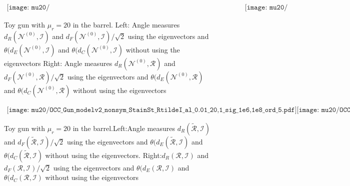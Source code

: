 \documentclass[a4paper,12]{article}
\theoremstyle{definition}
\begin{document}
\begin{figure}[h]
\begin{center}
$\begin{array}{cc}
\texttt{[image: mu20/OCC\_Gun\_modelv2\_nonsym\_StainSt\_N0I\_al\_0.01\_20,1\_sig\_1e6,1e8\_ord\_5.pdf]} &
\texttt{[image: mu20/OCC\_Gun\_modelv2\_nonsym\_StainSt\_N0R\_al\_0.01\_20,1\_sig\_1e6,1e8\_ord\_5.pdf]} 
\end{array}$
\end{center}
\caption{Toy gun with $\mu_r=20$ in the barrel.  Left: Angle measures $d_R({\mathcal N}^{(0)}, {\mathcal I})$ and $d_F({\mathcal N}^{(0)}, {\mathcal I})/\sqrt{2}$ using the eigenvectors and $\theta(d_E({\mathcal N}^{(0)}, {\mathcal I}) $ and $\theta(d_C({\mathcal N}^{(0)}, {\mathcal I} ) $ without using the eigenvectors Right: Angle measures $d_R({\mathcal N}^{(0)}, {\mathcal R})$ and $d_F({\mathcal N}^{(0)}, {\mathcal R})/\sqrt{2}$ using the eigenvectors and $\theta(d_E({\mathcal N}^{(0)}, {\mathcal R}) $ and $\theta(d_C({\mathcal N}^{(0)}, {\mathcal R} ) $ without using the eigenvectors}
\end{figure}

\begin{figure}[h]
\begin{center}
$\begin{array}{cc}
\texttt{[image: mu20/OCC\_Gun\_modelv2\_nonsym\_StainSt\_RtildeI\_al\_0.01\_20,1\_sig\_1e6,1e8\_ord\_5.pdf]} 
\texttt{[image: mu20/OCC\_Gun\_modelv2\_nonsym\_StainSt\_RI\_al\_0.01\_20,1\_sig\_1e6,1e8\_ord\_5.pdf]} &
\end{array}$
\end{center}
\caption{Toy gun with $\mu_r=20$ in the barrel.Left:Angle measures $d_R(\tilde{\mathcal R}, {\mathcal I})$ and $d_F(\tilde{\mathcal R}, {\mathcal I})/\sqrt{2}$ using the eigenvectors and $\theta(d_E(\tilde{\mathcal R}, {\mathcal I}) $ and $\theta(d_C(\tilde{\mathcal R} , {\mathcal I} ) $ without using the eigenvectors. Right:$d_R({\mathcal R}, {\mathcal I})$ and $d_F({\mathcal R}, {\mathcal I})/\sqrt{2}$ using the eigenvectors and $\theta(d_E({\mathcal R}, {\mathcal I}) $ and $\theta(d_C({\mathcal R} , {\mathcal I} ) $ without using the eigenvectors 
}
\end{figure}
\end{document}

